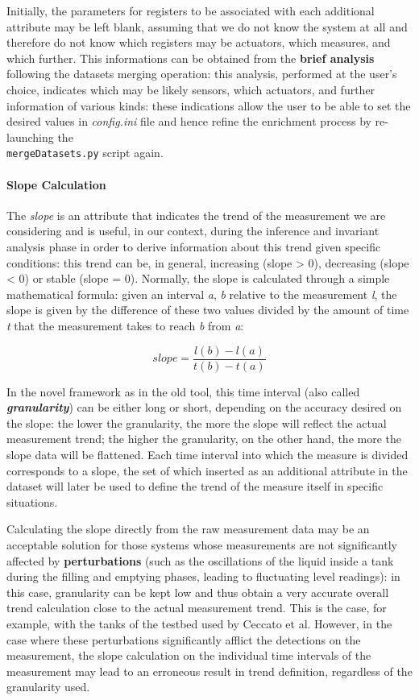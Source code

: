 Initially, the parameters for registers to be associated with each additional attribute may be left blank, assuming that we do not know the system at all and therefore do not know which registers may be actuators, which measures, and which further. This informations can be obtained from the \textbf{brief analysis} following the datasets merging operation: this analysis, performed at the user's choice, indicates which may be likely sensors, which actuators, and further information of various kinds: these indications allow the user to be able to set the desired values in \textit{config.ini} file and hence refine the enrichment process by re-launching the\\ 
\texttt{mergeDatasets.py} script again.

\paragraph{Slope Calculation}
The \textit{slope} is an attribute that indicates the trend of the measurement we are considering and is useful, in our context, during the inference and invariant analysis phase in order to derive information about this trend given specific conditions: this trend can be, in general, increasing (slope > 0), decreasing (slope < 0) or stable (slope = 0).\newline
Normally, the slope is calculated through a simple mathematical formula: given an interval \textit{a}, \textit{b} relative to the measurement \textit{l}, the slope is given by the difference of these two values divided by the amount of time \textit{t} that the measurement takes to reach \textit{b} from \textit{a}:

\[slope = \frac{l(b) -l(a)}{t(b) - t(a)}\]

In the novel framework as in the old tool, this time interval (also called \textbf{\textit{granularity}}) can be either long or short, depending on the accuracy desired on the slope: the lower the granularity, the more the slope will reflect the actual measurement trend; the higher the granularity, on the other hand, the more the slope data will be flattened. Each time interval into which the measure is divided corresponds to a slope, the set of which inserted as an additional attribute in the dataset will later be used to define the trend of the measure itself in specific situations.

\bigskip
Calculating the slope directly from the raw measurement data may be an acceptable solution for those systems whose measurements are not significantly affected by \textbf{perturbations} (such as the oscillations of the liquid inside a tank during the filling and emptying phases, leading to fluctuating level readings): in this case, granularity can be kept low and thus obtain a very accurate overall trend calculation close to the actual measurement trend. This is the case, for example, with the tanks of the testbed used by Ceccato et al.\newline
However, in the case where these perturbations significantly afflict the detections on the measurement, the slope calculation on the individual time intervals of the measurement may lead to an erroneous result in trend definition, regardless of the granularity used.

